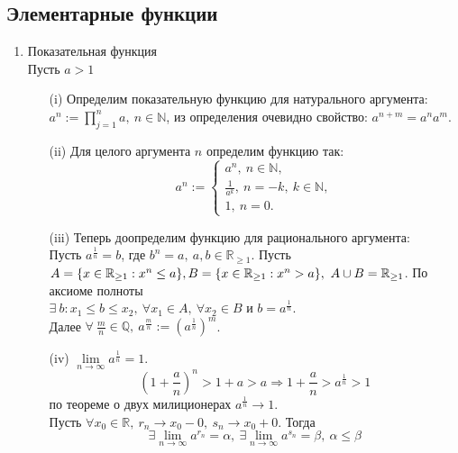\documentclass[a4paper, 12pt]{article}
\newcommand{\N}{\mathbb{N}}
\newcommand{\R}{\mathbb{R}}
\newcommand{\Q}{\mathbb{Q}}
\theoremstyle{definition}
\begin{document}
        \subsection{Элементарные функции}
        \begin{enumerate}
            \item Показательная функция\\
            Пусть $a>1$
            \begin{itemize}
                \item[(i)] Определим показательную функцию для натурального аргумента: \\
                $a^n:=\prod\limits_{j=1}^n a,\ n\in \N$, из определения очевидно свойство: $a^{n+m}=a^n a^m$.
                \item[(ii)] Для целого аргумента $n$ определим функцию так: 
                \[a^n:=\begin{cases}
                    a^n,\ n\in \N,\\
                    \frac{1}{a^k},\ n = -k,\ k\in \N,\\
                    1,\ n=0.
                \end{cases}\]
                \item[(iii)] Теперь доопределим функцию для рационального аргумента:\\
                Пусть $a^\frac{1}{n}=b$, где $b^n=a,\ a,b\in \R_{\geq 1}$. Пусть $A=\{x\in \R_{\geq 1}: x^n\leq a\},\\
                B=\{x\in \R_{\geq 1}: x^n>a\},\ A\cup B=\R_{\geq 1}$. По аксиоме полноты \\
                $\exists\ b: x_1\leq b\leq x_2,\ \forall x_1\in A,\ \forall x_2\in B$ и $b=a^{\frac{1}{n}}$.\\
                Далее $\forall\ \frac{m}{n}\in \Q,\ a^{\frac{m}{n}}:=(a^{\frac{1}{n}})^m$. 
                \item[(iv)] $\lim\limits_{n\to \infty} a^{\frac{1}{n}}=1$.
                \[(1+\frac{a}{n})^n>1+a>a \Rightarrow 1+\frac{a}{n}>a^{\frac{1}{n}}>1\]
                по теореме о двух милиционерах $a^{\frac{1}{n}}\to 1$.\\
                Пусть $\forall x_0\in \R,\ r_n\to x_0-0,\ s_n\to x_0+0$. Тогда 
                \[\exists \lim\limits_{n\to\infty}a^{r_n}=\alpha,\ \exists \lim\limits_{n\to \infty}a^{s_n}=\beta,\ \alpha\leq \beta\]

\end{itemize}
\end{enumerate}
\end{document}
